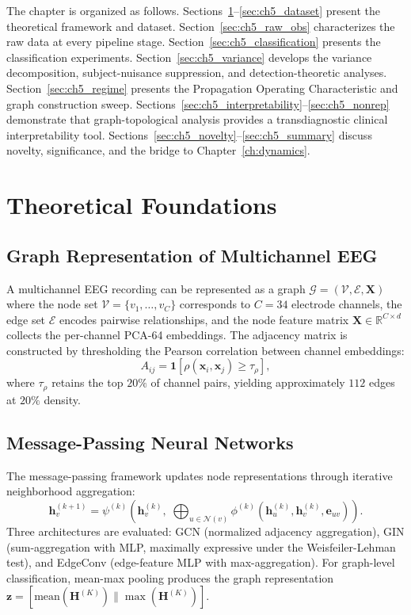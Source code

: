 The chapter is organized as follows. Sections~\ref{sec:ch5_gnn_theory}--\ref{sec:ch5_dataset} present the theoretical framework and dataset. Section~\ref{sec:ch5_raw_obs} characterizes the raw data at every pipeline stage. Section~\ref{sec:ch5_classification} presents the classification experiments. Section~\ref{sec:ch5_variance} develops the variance decomposition, subject-nuisance suppression, and detection-theoretic analyses. Section~\ref{sec:ch5_regime} presents the Propagation Operating Characteristic and graph construction sweep. Sections~\ref{sec:ch5_interpretability}--\ref{sec:ch5_nonrep} demonstrate that graph-topological analysis provides a transdiagnostic clinical interpretability tool. Sections~\ref{sec:ch5_novelty}--\ref{sec:ch5_summary} discuss novelty, significance, and the bridge to Chapter~\ref{ch:dynamics}.


\section{Theoretical Foundations}
\label{sec:ch5_gnn_theory}

\subsection{Graph Representation of Multichannel EEG}

A multichannel EEG recording can be represented as a graph $\mathcal{G} = (\mathcal{V}, \mathcal{E}, \mathbf{X})$ where the node set $\mathcal{V} = \{v_1, \ldots, v_C\}$ corresponds to $C = 34$ electrode channels, the edge set $\mathcal{E}$ encodes pairwise relationships, and the node feature matrix $\mathbf{X} \in \mathbb{R}^{C \times d}$ collects the per-channel PCA-64 embeddings. The adjacency matrix is constructed by thresholding the Pearson correlation between channel embeddings:
\begin{equation}
    A_{ij} = \mathbf{1}\left[\rho(\mathbf{x}_i, \mathbf{x}_j) \geq \tau_\rho\right],
\end{equation}
where $\tau_\rho$ retains the top $20\%$ of channel pairs, yielding approximately $112$ edges at $20\%$ density.

\subsection{Message-Passing Neural Networks}

The message-passing framework \cite{Gilmer2017} updates node representations through iterative neighborhood aggregation:
\begin{equation}
    \mathbf{h}_v^{(k+1)} = \psi^{(k)}\!\left(\mathbf{h}_v^{(k)},\; \bigoplus_{u \in \mathcal{N}(v)} \phi^{(k)}\!\left(\mathbf{h}_u^{(k)}, \mathbf{h}_v^{(k)}, \mathbf{e}_{uv}\right)\right).
\end{equation}
Three architectures are evaluated: GCN \cite{Kipf2017} (normalized adjacency aggregation), GIN \cite{Xu2019} (sum-aggregation with MLP, maximally expressive under the Weisfeiler-Lehman test), and EdgeConv \cite{Wang2019} (edge-feature MLP with max-aggregation). For graph-level classification, mean-max pooling produces the graph representation $\mathbf{z} = [\text{mean}(\mathbf{H}^{(K)}) \| \max(\mathbf{H}^{(K)})]$.

